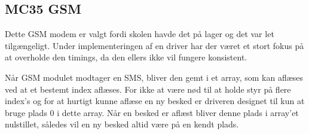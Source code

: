 \subsection{MC35 GSM}

Dette GSM modem er valgt fordi skolen havde det på lager og det var let tilgængeligt.
Under implementeringen af en driver har der været et stort fokus på at overholde den timings, da den ellers ikke vil fungere konsistent.

Når GSM modulet modtager en SMS, bliver den gemt i et array, som kan aflæses ved at et bestemt index aflæses. For ikke at være nød til at holde styr på flere index's og for at hurtigt kunne aflæse en ny besked er driveren designet til kun at bruge plads 0 i dette array. Når en besked er aflæst bliver denne plads i array'et nulstillet, således vil en ny besked altid være på en kendt plads.



